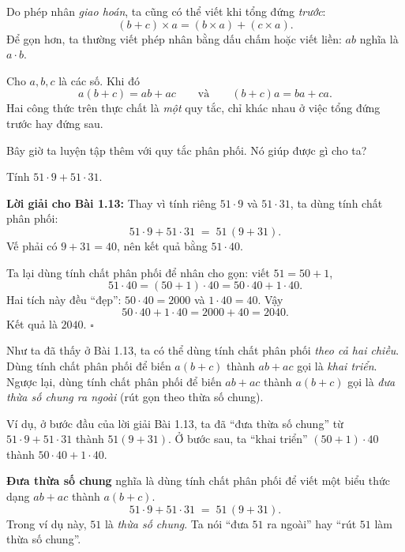 Do phép nhân \emph{giao hoán}, ta cũng có thể viết khi tổng đứng \emph{trước}:
\[
(b+c)\times a=(b\times a)+(c\times a).
\]
Để gọn hơn, ta thường viết phép nhân bằng dấu chấm hoặc viết liền:
\(ab\) nghĩa là \(a\cdot b\).

\begin{tcolorbox}[colback=yellow!10, colframe=orange!80!black,
title={Quan trọng: Phép nhân \emph{phân phối} qua phép cộng}]
Cho \(a,b,c\) là các số. Khi đó
\[
a(b+c)=ab+ac
\qquad\text{và}\qquad
(b+c)a=ba+ca.
\]
Hai công thức trên thực chất là \emph{một} quy tắc, chỉ khác nhau ở việc
tổng đứng trước hay đứng sau.
\end{tcolorbox}

Bây giờ ta luyện tập thêm với quy tắc phân phối. Nó giúp được gì cho ta?

\begin{problem}[1.13]
Tính \(51\cdot9 + 51\cdot31\).
\end{problem}

\noindent\textbf{Lời giải cho Bài 1.13:}
Thay vì tính riêng \(51\cdot9\) và \(51\cdot31\), ta dùng tính chất phân phối:
\[
51\cdot9 + 51\cdot31 \;=\; 51\,(9+31).
\]
Vế phải có \(9+31=40\), nên kết quả bằng \(51\cdot40\).

Ta lại dùng tính chất phân phối để nhân cho gọn: viết \(51=50+1\),
\[
51\cdot40=(50+1)\cdot40=50\cdot40+1\cdot40.
\]
Hai tích này đều “đẹp”: \(50\cdot40=2000\) và \(1\cdot40=40\).
Vậy
\[
50\cdot40+1\cdot40=2000+40=2040.
\]
Kết quả là \(\boxed{2040}\). \(\square\)


Như ta đã thấy ở Bài 1.13, ta có thể dùng tính chất phân phối
\emph{theo cả hai chiều}. Dùng tính chất phân phối để biến
\(a(b+c)\) thành \(ab+ac\) gọi là \emph{khai triển}. Ngược lại, dùng
tính chất phân phối để biến \(ab+ac\) thành \(a(b+c)\) gọi là
\emph{đưa thừa số chung ra ngoài} (rút gọn theo thừa số chung).

Ví dụ, ở bước đầu của lời giải Bài 1.13, ta đã “đưa thừa số chung”
từ \(51\cdot9+51\cdot31\) thành \(51(9+31)\).
Ở bước sau, ta “khai triển” \((50+1)\cdot40\) thành \(50\cdot40+1\cdot40\).

\begin{tcolorbox}[colback=blue!3,colframe=blue!60!black,title={Góc ý tưởng: Đưa thừa số chung}]
\textbf{Đưa thừa số chung} nghĩa là dùng tính chất phân phối để viết
một biểu thức dạng \(ab+ac\) thành \(a(b+c)\).
\[
51\cdot9+51\cdot31 \;=\; 51\,(9+31).
\]
Trong ví dụ này, \(51\) là \emph{thừa số chung}. Ta nói “đưa \(51\) ra
ngoài” hay “rút \(51\) làm thừa số chung”.
\end{tcolorbox}


